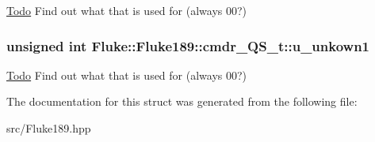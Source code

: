 \label{structFluke_1_1Fluke189_1_1cmdr__QS__t_a5df8b378d557e36494d127471e465612}
\begin{Desc}
\item[\hyperlink{todo__todo000005}{Todo}]Find out what that is used for (always 00?) \end{Desc}
\hypertarget{structFluke_1_1Fluke189_1_1cmdr__QS__t_a5a7897b4c26236a65ffc6d008b19ce67}{
\subsubsection[{u\_\-unkown1}]{\setlength{\rightskip}{0pt plus 5cm}unsigned int {\bf Fluke::Fluke189::cmdr\_\-QS\_\-t::u\_\-unkown1}}}
\label{structFluke_1_1Fluke189_1_1cmdr__QS__t_a5a7897b4c26236a65ffc6d008b19ce67}
\begin{Desc}
\item[\hyperlink{todo__todo000003}{Todo}]Find out what that is used for (always 00?) \end{Desc}


The documentation for this struct was generated from the following file:\begin{DoxyCompactItemize}
\item 
src/Fluke189.hpp\end{DoxyCompactItemize}
